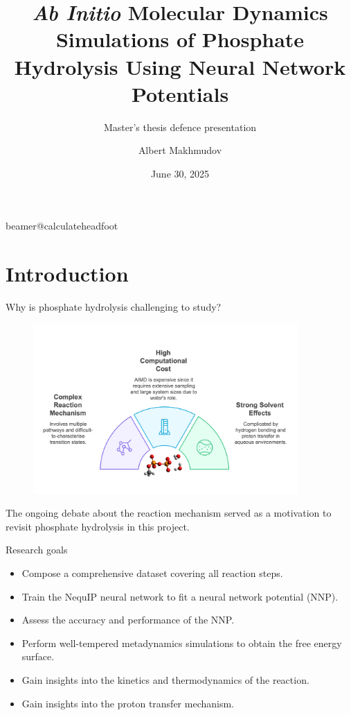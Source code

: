 \documentclass[11pt,t]{beamer}
\title[`AIMD' Simulations of Phosphate Hydrolysis Using NNPs]{\textit{Ab Initio} Molecular Dynamics Simulations of Phosphate Hydrolysis Using Neural Network Potentials} %
\subtitle{Master's thesis defence presentation}
\author{Albert Makhmudov}
\institute{Supervisor: Prof. J. Harvey}
\date{June 30, 2025}
\begin{document}
\csname beamer@calculateheadfoot\endcsname %



\begin{frame}
	\titlepage
\end{frame}



\section{Introduction}
\begin{frame}{Why is phosphate hydrolysis challenging to study?}
	\vspace{-30pt}
	\begin{figure}
		\centering
		\includegraphics[width=0.9\textwidth]{Figures/introduction_background.png}
	\end{figure}
	\vspace{-10pt}
	\small
	The ongoing debate about the reaction mechanism served as a motivation to revisit phosphate hydrolysis in this project.
\end{frame}



\begin{frame}{Research goals}
	\small
	\begin{itemize}
		\item Compose a comprehensive dataset covering all reaction steps.
		\item Train the NequIP neural network to fit a neural network potential (NNP).
		\item Assess the accuracy and performance of the NNP.
		\item Perform well-tempered metadynamics simulations to obtain the free energy surface.
		\item Gain insights into the kinetics and thermodynamics of the reaction.
		\item Gain insights into the proton transfer mechanism.
	\end{itemize}	
\end{frame}
\end{document}
